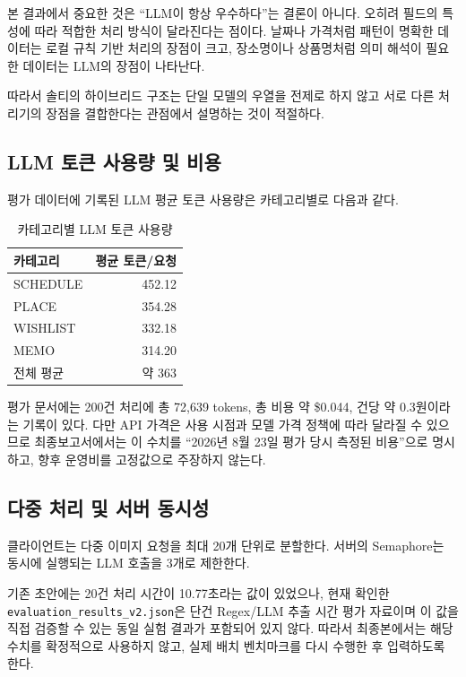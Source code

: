 \documentclass[11pt,a4paper]{article}
\newcommand{\placeholder}[1]{\fbox{\parbox{0.94\linewidth}{\textbf{[#1]}}}}
\begin{document}
본 결과에서 중요한 것은 ``LLM이 항상 우수하다''는 결론이 아니다. 오히려 필드의 특성에 따라 적합한 처리 방식이 달라진다는 점이다. 날짜나 가격처럼 패턴이 명확한 데이터는 로컬 규칙 기반 처리의 장점이 크고, 장소명이나 상품명처럼 의미 해석이 필요한 데이터는 LLM의 장점이 나타난다.

따라서 솔티의 하이브리드 구조는 단일 모델의 우열을 전제로 하지 않고 서로 다른 처리기의 장점을 결합한다는 관점에서 설명하는 것이 적절하다.

\subsection{LLM 토큰 사용량 및 비용}

평가 데이터에 기록된 LLM 평균 토큰 사용량은 카테고리별로 다음과 같다.

\begin{table}[H]
\centering
\small
\begin{tabularx}{0.85\linewidth}{l r}
\toprule
\textbf{카테고리} & \textbf{평균 토큰/요청}\\
\midrule
SCHEDULE & 452.12\\
PLACE & 354.28\\
WISHLIST & 332.18\\
MEMO & 314.20\\
\midrule
전체 평균 & 약 363\\
\bottomrule
\end{tabularx}
\caption{카테고리별 LLM 토큰 사용량}
\end{table}

평가 문서에는 200건 처리에 총 72,639 tokens, 총 비용 약 \$0.044, 건당 약 0.3원이라는 기록이 있다. 다만 API 가격은 사용 시점과 모델 가격 정책에 따라 달라질 수 있으므로 최종보고서에서는 이 수치를 ``2026년 8월 23일 평가 당시 측정된 비용''으로 명시하고, 향후 운영비를 고정값으로 주장하지 않는다.

\subsection{다중 처리 및 서버 동시성}

클라이언트는 다중 이미지 요청을 최대 20개 단위로 분할한다. 서버의 Semaphore는 동시에 실행되는 LLM 호출을 3개로 제한한다.

\placeholder{그림 삽입: 단건 요청과 다중 요청의 처리 흐름 및 Semaphore=3 구조}

기존 초안에는 20건 처리 시간이 10.77초라는 값이 있었으나, 현재 확인한 \texttt{evaluation\_results\_v2.json}은 단건 Regex/LLM 추출 시간 평가 자료이며 이 값을 직접 검증할 수 있는 동일 실험 결과가 포함되어 있지 않다. 따라서 최종본에서는 해당 수치를 확정적으로 사용하지 않고, 실제 배치 벤치마크를 다시 수행한 후 입력하도록 한다.
\end{document}
